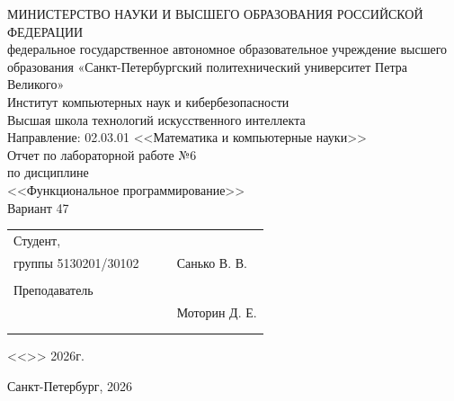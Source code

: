 \documentclass[a4paper, final]{article}
\begin{document}
	
	\begin{center}
		\hfill \break
		\hfill \break
		\normalsize{МИНИСТЕРСТВО НАУКИ И ВЫСШЕГО ОБРАЗОВАНИЯ РОССИЙСКОЙ ФЕДЕРАЦИИ\\
			федеральное государственное автономное образовательное учреждение высшего образования «Санкт-Петербургский политехнический университет Петра Великого»\\[10pt]}
		\normalsize{Институт компьютерных наук и кибербезопасности}\\[10pt] 
		\normalsize{Высшая школа технологий искусственного интеллекта}\\[10pt] 
		\normalsize{Направление: 02.03.01 <<Математика и компьютерные науки>>}\\
		
		\hfill \break
		\hfill \break
		\hfill \break
		\hfill \break
		\large{Отчет по лабораторной работе №6}\\
		\large{по дисциплине}\\
		\large{<<Функциональное программирование>>}\\
		\large{Вариант 47}\\
		\hfill \break
	\end{center}
	
	\small{ 
		\begin{tabular}{lrrl}
			\!\!\!Студент, & \hspace{2cm} & & \\
			\!\!\!группы 5130201/30102 & \hspace{2cm} & \underline{\hspace{3cm}} &Санько В. В. \\\\
			\!\!\!Преподаватель\\ \hspace{-5pt} & \hspace{2cm} &  \underline{\hspace{3cm}} &  Моторин Д. Е. \\\\
			&&\hspace{4cm}
		\end{tabular}
		\begin{flushright}
			<<\underline{\hspace{1cm}}>>\underline{\hspace{2.5cm}} 2026г.
		\end{flushright}
	}
	
	\hfill \break
	\vspace{3cm}
	\begin{center} \small{Санкт-Петербург, 2026} \end{center}
	\thispagestyle{empty}
	
\end{document}
